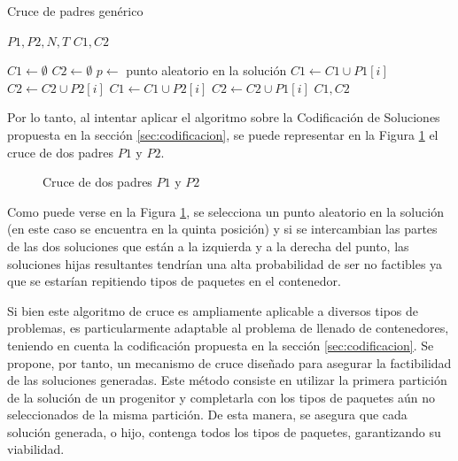 \documentclass[openany]{article}
\begin{document}
\begin{algorithm}[H]
    \caption{Cruce de padres genérico}\label{alg:crucePadresGenerico}
    \begin{algorithmic}[1]
        \Require $P1, P2, N, T$
        \Ensure $C1, C2$

        \State $C1 \leftarrow \emptyset$
        \State $C2 \leftarrow \emptyset$
        \State $p \leftarrow$ punto aleatorio en la solución
        \State $C1 \leftarrow C1 \cup P1[i]$
        \State $C2 \leftarrow C2 \cup P2[i]$
        \Else
        \State $C1 \leftarrow C1 \cup P2[i]$
        \State $C2 \leftarrow C2 \cup P1[i]$
        \EndIf
        \EndFor
        \State \Return $C1, C2$
    \end{algorithmic}
\end{algorithm}

Por lo tanto, al intentar aplicar el algoritmo sobre la Codificación de Soluciones propuesta en la sección \ref{sec:codificacion}, se puede representar en la Figura \ref{fig:cruce_simple} el cruce de dos padres $P1$ y $P2$.

\begin{figure}[H]
    \centering
    
    \caption{Cruce de dos padres $P1$ y $P2$}
    \label{fig:cruce_simple}
\end{figure}

Como puede verse en la Figura \ref{fig:cruce_simple}, se selecciona un punto aleatorio en la solución (en este caso se encuentra en la quinta posición) y si se intercambian las partes de las dos soluciones que están a la izquierda y a la derecha del punto, las soluciones hijas resultantes tendrían una alta probabilidad de ser no factibles ya que se estarían repitiendo tipos de paquetes en el contenedor.

Si bien este algoritmo de cruce es ampliamente aplicable a diversos tipos de problemas, es particularmente adaptable al problema de llenado de contenedores, teniendo en cuenta la codificación propuesta en la sección \ref{sec:codificacion}. Se propone, por tanto, un mecanismo de cruce diseñado para asegurar la factibilidad de las soluciones generadas. Este método consiste en utilizar la primera partición de la solución de un progenitor y completarla con los tipos de paquetes aún no seleccionados de la misma partición. De esta manera, se asegura que cada solución generada, o hijo, contenga todos los tipos de paquetes, garantizando su viabilidad.
\end{document}
